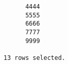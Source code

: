 \documentclass[11pt]{report}
\begin{document}
\begin{itemize}
\begin{verbatim}
      4444                                                                                                                                                                                                                                                                                                                                                                                                                                                                                                          
      5555                                                                                                                                                                                                                                                                                                                                                                                                                                                                                                          
      6666                                                                                                                                                                                                                                                                                                                                                                                                                                                                                                          
      7777                                                                                                                                                                                                                                                                                                                                                                                                                                                                                                          
      9999                                                                                                                                                                                                                                                                                                                                                                                                                                                                                                          

13 rows selected.
  \end{verbatim}
\end{itemize}
\end{document}
